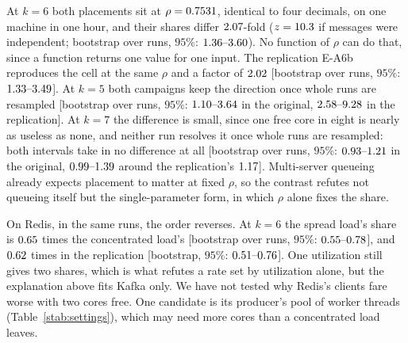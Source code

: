 \documentclass[10pt,journal,onecolumn]{IEEEtran}
\newcommand{\kafka}{Kafka}
\newcommand{\redis}{Redis}
\begin{document}
At $k=6$ both placements sit at $\rho=0.7531$, identical to four decimals, on one machine in
one hour, and their shares differ $2.07$-fold ($z=10.3$ if messages were
independent; bootstrap over runs, $95\%$: $\placeKafkaOrigCI$). No function of $\rho$
can do that, since a function returns one value for one input. The replication E-A6b reproduces
the cell at the same $\rho$ and a factor of $2.02$ [bootstrap over runs, $95\%$:
$\placeKafkaReplCI$]. At $k=5$ both campaigns keep the direction once whole runs are resampled
[bootstrap over runs, $95\%$: $\geomFiveOrigRunCI$ in the original, $\geomFiveReplRunCI$ in the
replication]. At $k=7$ the difference is small, since one free core in eight is nearly as useless
as none, and neither run resolves it once whole runs are resampled: both intervals take in no
difference at all [bootstrap over runs, $95\%$: $\geomSevenOrigRunCI$ in the original,
$\geomSevenReplRunCI$ around the replication's $1.17$]. Multi-server queueing already expects placement to matter at fixed
$\rho$, so the contrast refutes not queueing itself but the single-parameter form, in which $\rho$
alone fixes the share.

On \redis{}, in the same runs, the order reverses. At $k=6$ the spread load's share is
$0.65$ times the concentrated load's [bootstrap over runs, $95\%$: $\placeRedisOrigCI$],
and $0.62$ times in the replication [bootstrap, $95\%$: $\placeRedisReplCI$]. One utilization still gives two shares, which is what refutes a
rate set by utilization alone, but the explanation above fits \kafka{} only. We have not tested
why \redis{}'s clients fare worse with two cores free. One candidate is its producer's pool of
worker threads (Table~\ref{stab:settings}), which may need more cores than a concentrated load
leaves.

\begin{table}[tb]
\caption{\textbf{At $k=6$ one utilization gives two shares, in two campaigns.} Concentrated load
leaves $C-k$ cores free; spread load duty-cycles all of them and leaves none. Every cell is
\kafka{}'s $\geomEventsLo$ to $\geomEventsHi$ matched events over $25$ runs, and $z$ is a
two-proportion test between the two placements of a row, which treats messages as independent.
Generated at build time from the campaign files. Achieved $\rho$ at $k=6$ is $\mechGeomRho$ in all four configurations; at
$k=5$ it is $0.6284$/$0.6250$ and $0.6284$/$0.6259$, and at $k=7$ $0.8778$/$0.8809$ and
$0.8778$/$0.8822$.}
\label{stab:geometry}
\centering
\footnotesize

\end{table}
\end{document}
